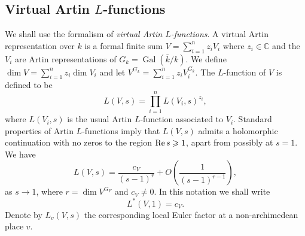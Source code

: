 \documentclass[a4paper,12pt,reqno]{amsart}
\numberwithin{equation}{section} \numberwithin{figure}{section}
\DeclareMathOperator{\Gal}{Gal} \DeclareMathOperator{\NS}{NS}
\newcommand\CC{\mathbb{C}}
\renewcommand{\geq}{\geqslant}
\renewcommand{\#}{\sharp}
\theoremstyle{definition}
\numberwithin{lemma}{section}
\begin{document}
\subsection{Virtual Artin $L$-functions} %
We  shall use the formalism of \textit{virtual Artin $L$-functions}.
A virtual Artin representation over $k$ is a formal finite sum
$V = \sum_{i=1}^n z_iV_i$
where $z_i \in \CC$ and the $V_i$ are Artin representations of $G_k = \Gal(\bar{k}/k)$.
We define $\dim V = \sum_{i=1}^n z_i \dim V_i$
and let $V^{G_k}=\sum_{i=1}^n z_i V_i^{G_k}$.
The $L$-function of $V$ is defined to be
$$L(V,s)=\prod_{i=1}^n L(V_i,s)^{z_i},$$
where $L(V_i,s)$ is the usual Artin $L$-function associated to $V_i$. 
Standard properties of Artin $L$-functions imply that $L(V,s)$ admits a holomorphic
continuation with no zeros to the region $\re s \geq 1$, apart from possibly at $s=1$.
We have
$$L(V,s) = \frac{c_V}{(s-1)^{r}} + O\left(\frac{1}{(s-1)^{r-1}}\right),$$
as $s \to 1$, where $r = \dim V^{G_F}$ and $c_V \neq 0$.
In this notation we shall write
$$L^*(V,1) = c_V.$$
Denote by $L_v(V,s)$ the corresponding local Euler factor at a non-archimedean place $v$.
\end{document}
